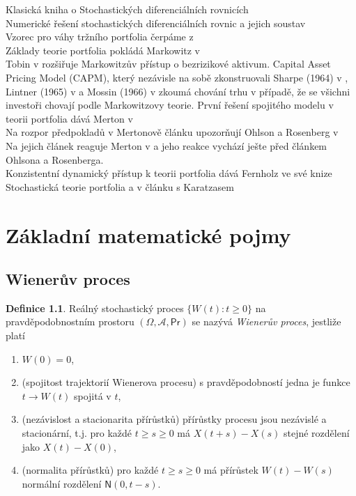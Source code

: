 \documentclass[a4paper,12pt]{report}
\theoremstyle{definition} \newtheorem{definice}[veta]{Definice}
\theoremstyle{remark}
\begin{document}
Klasická kniha o Stochastických diferenciálních rovnicích \cite{oksendal2003stochastic}\\
Numerické řešení stochastických diferenciálních rovnic a jejich soustav \cite{kloeden1997}\\
Vzorec pro váhy tržního portfolia čerpáme z \cite{fabozzi}\\
Základy teorie portfolia pokládá Markowitz v \cite{markowitz}\\
Tobin v \cite{tobin} rozšiřuje Markowitzův přístup o bezrizikové aktivum.
Capital Asset Pricing Model (CAPM), který nezávisle na sobě zkonstruovali Sharpe (1964) v \cite{sharpe1964}, Lintner (1965) v \cite{lintner1965} a Mossin (1966) v \cite{mossin1966} zkoumá chování trhu v případě, že se všichni investoři chovají podle Markowitzovy teorie.
První řešení spojitého modelu v teorii portfolia dává Merton v \cite{merton1971}\\
Na rozpor předpokladů v Mertonově článku \cite{merton1971} upozorňují Ohlson a Rosenberg v \cite{ohlson}\\
Na jejich článek reaguje Merton v \cite{merton1975} a jeho reakce vychází ješte před článkem Ohlsona a Rosenberga.\\

Konzistentní dynamický přístup k teorii portfolia dává Fernholz ve své knize Stochastická teorie portfolia \cite{fern} a v článku s Karatzasem \cite{kara}\\


\chapter{Základní matematické pojmy}

\section{Wienerův proces}

\begin{definice}
Reálný stochastický proces $\{W(t):t\ge0\}$ na pravděpodobnostním prostoru $(\Omega,\mathcal{A},\mathsf{Pr})$ se nazývá \textit{Wienerův proces}, jestliže platí
\begin{enumerate}
\item[1.]$W(0)=0$, 
\item[2.](spojitost trajektorií Wienerova procesu) s pravděpodobností jedna je funkce $t\to W(t)$ spojitá v $t$,
\item[3.](nezávislost a stacionarita přírůstků) přírůstky procesu jsou nezávislé a stacionární, t.j.  pro každé $t\ge s\ge0$ má $X(t+s)-X(s)$ stejné rozdělení jako $X(t)-X(0)$,
\item[4.](normalita přírůstků) pro každé $t\ge s\ge0$ má přírůstek $W(t)-W(s)$ normální rozdělení $\mathsf{N}(0, t-s)$.
\end{enumerate}
\end{definice}
\end{document}
